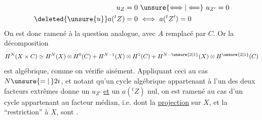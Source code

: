 \[
\begin{aligned}
u_Z=0&\ \unsure{\Longleftrightarrow|\Longleftarrow}\ u_{Z'}=0\\
\deleted{\unsure{u}}a({}^t Z)=0&\ \Longleftrightarrow\ a({}^t Z')=0
\end{aligned}
\]
On est donc ramené à la question analogue,
avec $A$ remplacé par $C$. Or  la décomposition
\[
H^N(X\times C)\simeq H^N(X)\otimes H^0(C)+H^{N-1}(X)\otimes H^1(C)+H^{N-\unsure{2|1}}(X)\otimes H^{\unsure{2|1}}(C)
\]
est algébrique, comme  on vérifie aisément.
Appliquant ceci au cas $N\unsure{=|\,}2i$, et notant
qu'un cycle algébrique appartenant à l'un des
deux facteurs extrêmes donne un $u_{Z'}$ \uline{et}
un $a({}^t Z)$ nul, on est ramené au
cas d'un cycle appartenant au facteur
médian, i.e. dont la \uline{projection} sur $X$, et
la ``restriction'' à $X$, sont .
